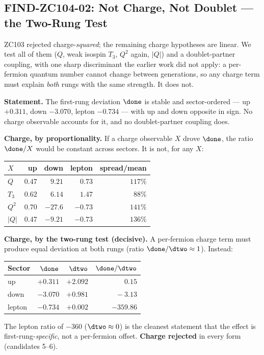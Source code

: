 \documentclass[12pt, a4paper]{article}
\begin{document}
\subsection{FIND-ZC104-02: Not Charge, Not Doublet --- the Two-Rung Test}
\label{sec:charge-zc104}

ZC103 rejected charge-\emph{squared}; the remaining charge hypotheses are
linear. We test all of them ($Q$, weak isospin $T_3$, $Q^2$ again, $|Q|$) and a
doublet-partner coupling, with one sharp discriminant the earlier work did not
apply: a per-fermion quantum number cannot change between generations, so any
charge term must explain \emph{both} rungs with the same strength. It does not.

\begin{formalbox}[title={FIND-ZC104-02: The first-rung effect is sector-ordered but not charge, not doublet ($R_1$, numerical)}]

\textbf{Statement.} The first-rung deviation $\done$ is stable and sector-ordered
--- up $+0.311$, down $-3.070$, lepton $-0.734$ --- with up and down opposite in
sign. No charge observable accounts for it, and no doublet-partner coupling does.

\textbf{Charge, by proportionality.} If a charge observable $X$ drove $\done$,
the ratio $\done/X$ would be constant across sectors. It is not, for any $X$:
\begin{center}
{\small\renewcommand{\arraystretch}{1.25}
\begin{tabular}{@{}lrrrr@{}}
\toprule
$X$ & up & down & lepton & spread/mean \\
\midrule
$Q$    & $0.47$ & $9.21$  & $0.73$  & $117\%$ \\
$T_3$  & $0.62$ & $6.14$  & $1.47$  & $\phantom{0}88\%$ \\
$Q^2$  & $0.70$ & $-27.6$ & $-0.73$ & $141\%$ \\
$|Q|$  & $0.47$ & $-9.21$ & $-0.73$ & $136\%$ \\
\bottomrule
\end{tabular}}
\end{center}

\textbf{Charge, by the two-rung test (decisive).} A per-fermion charge term must
produce equal deviation at both rungs (ratio $\done/\dtwo\approx1$). Instead:
\begin{center}
{\small\renewcommand{\arraystretch}{1.25}
\begin{tabular}{@{}lrrr@{}}
\toprule
Sector & $\done$ & $\dtwo$ & $\done/\dtwo$ \\
\midrule
up     & $+0.311$ & $+2.092$ & $\phantom{-00}0.15$ \\
down   & $-3.070$ & $+0.981$ & $\phantom{00}-3.13$ \\
lepton & $-0.734$ & $+0.002$ & $-359.86$ \\
\bottomrule
\end{tabular}}
\end{center}
The lepton ratio of $-360$ ($\dtwo\approx0$) is the cleanest statement that the
effect is first-rung-\emph{specific}, not a per-fermion offset. \textbf{Charge
rejected} in every form (candidates 5--6).


\end{formalbox}
\end{document}
